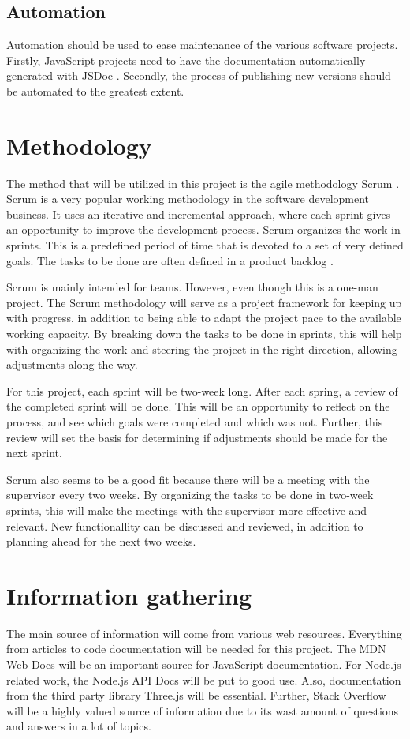 \subsection{Automation}
Automation should be used to ease maintenance of the various software projects. Firstly, JavaScript projects need to have the documentation automatically generated with JSDoc \cite{jsdoc}. Secondly, the process of publishing new versions should be automated to the greatest extent.

\section{Methodology}
The method that will be utilized in this project is the agile methodology Scrum \cite{scrum}. Scrum is a very popular working methodology in the software development business. It uses an iterative and incremental approach, where each sprint gives an opportunity to improve the development process. Scrum organizes the work in sprints. This is a predefined period of time that is devoted to a set of very defined goals. The tasks to be done are often defined in a product backlog \cite{product-backlog}.

Scrum is mainly intended for teams. However, even though this is a one-man project. The Scrum methodology will serve as a project framework for keeping up with progress, in addition to being able to adapt the project pace to the available working capacity. By breaking down the tasks to be done in sprints, this will help with organizing the work and steering the project in the right direction, allowing adjustments along the way.

For this project, each sprint will be two-week long. After each spring, a review of the completed sprint will be done. This will be an opportunity to reflect on the process, and see which goals were completed and which was not. Further, this review will set the basis for determining if adjustments should be made for the next sprint.

Scrum also seems to be a good fit because there will be a meeting with the supervisor every two weeks. By organizing the tasks to be done in two-week sprints, this will make the meetings with the supervisor more effective and relevant. New functionallity can be discussed and reviewed, in addition to planning ahead for the next two weeks.

\section{Information gathering}
The main source of information will come from various web resources. Everything from articles to code documentation will be needed for this project. The MDN Web Docs \cite{mdn-web-docs} will be an important source for JavaScript documentation. For Node.js related work, the Node.js API Docs \cite{node.js-api-docs} will be put to good use. Also, documentation from the third party library Three.js \cite{three.js-docs} will be essential. Further, Stack Overflow \cite{stack-overflow} will be a highly valued source of information due to its wast amount of questions and answers in a lot of topics.

